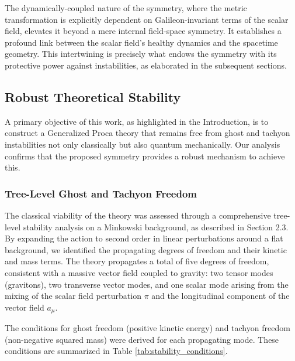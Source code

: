 \documentclass[twocolumn]{aastex631}
\begin{document}
The dynamically-coupled nature of the symmetry, where the metric transformation is explicitly dependent on Galileon-invariant terms of the scalar field, elevates it beyond a mere internal field-space symmetry. It establishes a profound link between the scalar field's healthy dynamics and the spacetime geometry. This intertwining is precisely what endows the symmetry with its protective power against instabilities, as elaborated in the subsequent sections.

\subsection{Robust Theoretical Stability}

A primary objective of this work, as highlighted in the Introduction, is to construct a Generalized Proca theory that remains free from ghost and tachyon instabilities not only classically but also quantum mechanically. Our analysis confirms that the proposed symmetry provides a robust mechanism to achieve this.

\subsubsection{Tree-Level Ghost and Tachyon Freedom}
The classical viability of the theory was assessed through a comprehensive tree-level stability analysis on a Minkowski background, as described in Section 2.3. By expanding the action to second order in linear perturbations around a flat background, we identified the propagating degrees of freedom and their kinetic and mass terms. The theory propagates a total of five degrees of freedom, consistent with a massive vector field coupled to gravity: two tensor modes (gravitons), two transverse vector modes, and one scalar mode arising from the mixing of the scalar field perturbation $\pi$ and the longitudinal component of the vector field $a_\mu$.

The conditions for ghost freedom (positive kinetic energy) and tachyon freedom (non-negative squared mass) were derived for each propagating mode. These conditions are summarized in Table \ref{tab:stability_conditions}.
\end{document}
